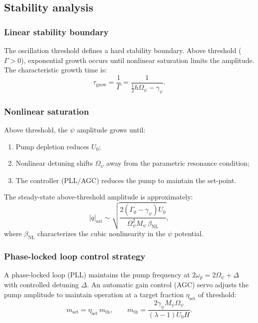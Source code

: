 \documentclass[12pt,aps,prd,twocolumn,superscriptaddress,nofootinbib]{revtex4-2}
\newcommand{\Opsi}{\Omega_\psi}
\newcommand{\gpsi}{\gamma_\psi}
\newcommand{\Mpsi}{M_\psi}
\begin{document}
\subsection{Stability analysis}
\label{sec:stability}

\subsubsection{Linear stability boundary}

The oscillation threshold defines a hard stability boundary.  Above
threshold ($\Gamma > 0$), exponential growth occurs until nonlinear
saturation limits the amplitude.  The characteristic growth time is:
\begin{equation}
  \tau_{\mathrm{grow}} = \frac{1}{\Gamma}
  = \frac{1}{\tfrac{1}{2}h\Opsi - \gpsi}.
  \label{eq:growth_time}
\end{equation}

\subsubsection{Nonlinear saturation}

Above threshold, the $\psi$ amplitude grows until:
\begin{enumerate}[noitemsep]
  \item Pump depletion reduces $U_0$;
  \item Nonlinear detuning shifts $\Opsi$ away from the parametric
    resonance condition;
  \item The controller (PLL/AGC) reduces the pump to maintain the
    set-point.
\end{enumerate}

The steady-state above-threshold amplitude is approximately:
\begin{equation}
  |q|_{\mathrm{sat}} \sim \sqrt{\frac{2(\Gamma_0 - \gpsi)U_0}
    {\Opsi^2\Mpsi\,\beta_{\mathrm{NL}}}},
  \label{eq:saturation}
\end{equation}
where $\beta_{\mathrm{NL}}$ characterizes the cubic nonlinearity in the
$\psi$ potential.

\subsubsection{Phase-locked loop control strategy}

A phase-locked loop (PLL) maintains the pump frequency at
$2\omega_p = 2\Opsi + \Delta$ with controlled detuning $\Delta$.
An automatic gain control (AGC) servo adjusts the pump amplitude to
maintain operation at a target fraction $\eta_{\mathrm{set}}$ of
threshold:
\begin{equation}
  m_{\mathrm{set}} = \eta_{\mathrm{set}}\,m_{\mathrm{th}},
  \qquad m_{\mathrm{th}} = \frac{2\gpsi\Mpsi\Opsi}{(\lambda-1)U_0 H}.
  \label{eq:AGC_setpoint}
\end{equation}
\end{document}
